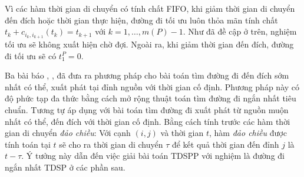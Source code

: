 \documentclass[../main.tex]{subfiles}
\begin{document}
Vì các hàm thời gian di chuyển có tính chất FIFO, khi giảm thời gian di
chuyển đến đích hoặc thời gian thực hiện, đường đi tối ưu luôn thỏa mãn
tính chất \(t_k + c_{i_k, i_{k+1}}(t_k) = t_{k+1}\) với
\(k = 1, \dots, m(P)-1\). Như đã đề cập ở trên, nghiệm tối ưu sẽ không
xuất hiện chờ đợi. Ngoài ra, khi giảm thời gian đến đích, đường đi tối
ưu sẽ có \(t_1^P = 0\).

Ba bài báo \cite{cooke1966shortest}, \cite{orda1990shortest}, \cite{dean2004shortest} đã đưa ra phương pháp
cho bài toán tìm đường đi đến đích sớm nhất có thể,  xuất phát tại đỉnh nguồn với thời gian cố định. 
Phương pháp này có độ phức tạp đa thức bằng cách mở rộng thuật toán tìm đường đi ngắn nhất
tiêu chuẩn. Tương tự áp dụng với bài toán tìm đường đi 
xuất phát từ nguồn muộn nhất có thể, đến đích với thời gian cố định.
Bằng cách tính trước các hàm thời gian di chuyển \emph{đảo chiều}: Với
cạnh \((i, j)\) và thời gian \(t\), hàm \emph{đảo chiều} được tính toán
tại \(t\) sẽ cho ra thời gian di chuyển \(\tau\) để kết quả thời gian
đến đỉnh \(j\) là \(t-\tau\). Ý tưởng này dẫn đến việc giải bài toán
TDSPP với nghiệm là đường đi ngắn nhất TDSP ở các phần sau.

\backmatter
\end{document}
